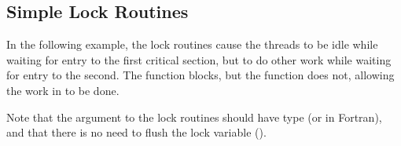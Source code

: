 \subsection{Simple Lock Routines}
\label{subsec:simple_lock}

In the following example, the lock routines cause the threads to be idle while 
waiting for entry to the first critical section, but to do other work while waiting 
for entry to the second. The  function blocks, but the  
function does not, allowing the work in  to be done. 

Note that the argument to the lock routines should have type 
 (or  in Fortran), 
and that there is no need to flush the lock variable (). 




